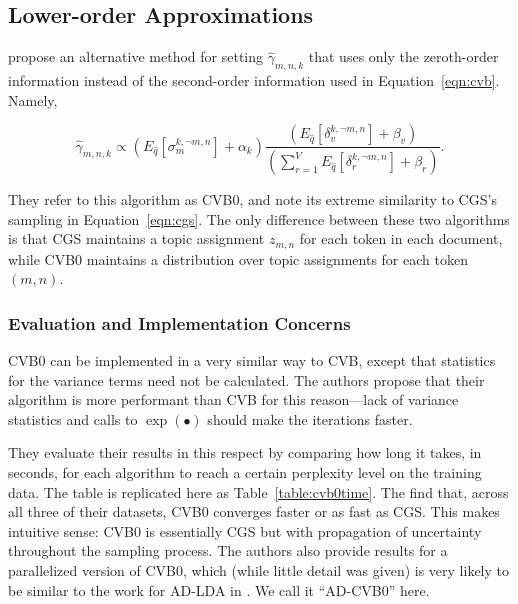 \documentclass[11pt]{article}
\begin{document}
\subsection{Lower-order Approximations}
\citet{Asuncion:2009:onsmoothing} propose an alternative method for setting
$\hat{\gamma}_{m,n,k}$ that uses only the zeroth-order information instead
of the second-order information used in Equation~\ref{eqn:cvb}. Namely,

\begin{equation}
  \hat{\gamma}_{m,n,k} \propto
  \left(E_{\hat{q}}[\sigma_m^{k,\neg m,n}] + \alpha_k\right)
  \frac{\left(E_{\hat{q}}[\delta_v^{k,\neg m,n}] + \beta_v\right)}
  {\left(\sum_{r=1}^V E_{\hat{q}}[\delta_r^{k, \neg m,n}] +
  \beta_r\right)}.
  \label{eqn:cvb0}
\end{equation}

They refer to this algorithm as CVB0, and note its extreme similarity to
CGS's sampling in Equation~\ref{eqn:cgs}. The only difference between these
two algorithms is that CGS maintains a topic assignment $z_{m,n}$ for each
token in each document, while CVB0 maintains a distribution over topic
assignments for each token $(m,n)$.

\subsubsection{Evaluation and Implementation Concerns}
CVB0 can be implemented in a very similar way to CVB, except that
statistics for the variance terms need not be calculated. The authors
propose that their algorithm is more performant than CVB for this
reason---lack of variance statistics and calls to $\exp(\bullet)$ should
make the iterations faster.

They evaluate their results in this respect by comparing how long it takes,
in seconds, for each algorithm to reach a certain perplexity level on the
training data. The table is replicated here as Table~\ref{table:cvb0time}.
The find that, across all three of their datasets, CVB0 converges faster or
as fast as CGS. This makes intuitive sense: CVB0 is essentially CGS but
with propagation of uncertainty throughout the sampling process. The
authors also provide results for a parallelized version of CVB0, which
(while little detail was given) is very likely to be similar to the work
for AD-LDA in \citet{Newman:2009:ADLDA}. We call it ``AD-CVB0'' here.
\end{document}
